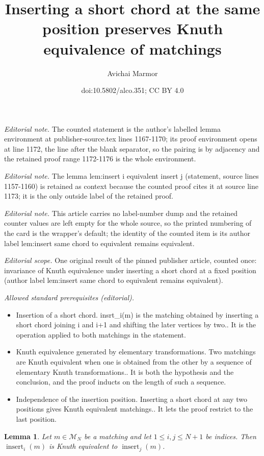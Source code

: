 \documentclass[11pt]{article}
\title{Inserting a short chord at the same position preserves Knuth equivalence of matchings}
\author{Avichai Marmor}
\date{doi:10.5802/alco.351; CC BY 4.0}
\newtheorem{lemma}[theo]{Lemma}
\theoremstyle{definition}
\numberwithin{equation}{section}
\newcommand{\insrt}{\operatorname{insert}}
\newcommand{\M}{\mathcal{M}}
\begin{document}
\maketitle
\noindent\textit{Editorial note.} The counted statement is the author's labelled lemma environment at publisher-source.tex lines 1167-1170; its proof environment opens at line 1172, the line after the blank separator, so the pairing is by adjacency and the retained proof range 1172-1176 is the whole environment.\par\medskip
\noindent\textit{Editorial note.} The lemma lem:insert i equivalent insert j (statement, source lines 1157-1160) is retained as context because the counted proof cites it at source line 1173; it is the only outside label of the retained proof.\par\medskip
\noindent\textit{Editorial note.} This article carries no label-number dump and the retained counter values are left empty for the whole source, so the printed numbering of the card is the wrapper's default; the identity of the counted item is its author label lem:insert same chord to equivalent remains equivalent.\par\medskip
\noindent\textit{Editorial scope.} One original result of the pinned publisher article, counted once: invariance of Knuth equivalence under inserting a short chord at a fixed position (author label lem:insert same chord to equivalent remains equivalent).\par\medskip
\noindent\textit{Allowed standard prerequisites (editorial).}\begin{itemize}
\item Insertion of a short chord. insrt\_i(m) is the matching obtained by inserting a short chord joining i and i+1 and shifting the later vertices by two.. It is the operation applied to both matchings in the statement.
\item Knuth equivalence generated by elementary transformations. Two matchings are Knuth equivalent when one is obtained from the other by a sequence of elementary Knuth transformations.. It is both the hypothesis and the conclusion, and the proof inducts on the length of such a sequence.
\item Independence of the insertion position. Inserting a short chord at any two positions gives Knuth equivalent matchings.. It lets the proof restrict to the last position.
\end{itemize}\medskip
\begin{lemma}
\label{lem:insert i equivalent insert j}
    Let $m \in \M_N$ be a matching and let $1 \le i,j \le N+1$ be indices. Then $\insrt_i(m)$ is Knuth equivalent to $\insrt_j(m)$.
\end{lemma}
\end{document}
